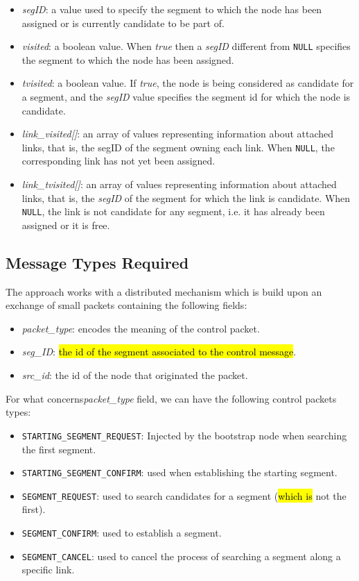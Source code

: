 \begin{itemize}
\item{\emph{segID}}: a value used to specify the segment to which the
node has been assigned or is currently candidate to be part of.
\item{\emph{visited}}: a boolean value. When \emph{true}
then a \emph{segID} different from \texttt{NULL} specifies the segment 
to which the node has been assigned. 
\item{\emph{tvisited}}: a boolean value. If \emph{true}, the node is
being considered as candidate for a segment, and the \emph{segID} value
specifies the segment id for which the node is candidate. 
\item{\emph{link\_visited[]}}: an array
of values representing information about attached links, that is, the
segID of the segment owning each link. When \texttt{NULL}, the corresponding link has not yet been
assigned.
\item{\emph{link\_tvisited[]}}: an array of
values representing information about attached links, that is, the \emph{segID} of
the segment for which the link is candidate. When \texttt{NULL}, the link is
not candidate for any segment, i.e. it has already been assigned or it is free.
\end{itemize}

\subsection{Message Types Required}

The \disr{} approach works with a distributed mechanism which is build
upon an exchange of small packets containing the following fields:
\begin{itemize}
\item \emph{packet\_type}: encodes the meaning of the control packet.
\item \emph{seg\_ID}: \hl{the id of the segment associated to the \disr{} control message}.
\item \emph{src\_id}: the id of the node that originated the packet.
\end{itemize}

For what concerns\emph{packet\_type} field, we can have the following control packets types:
\begin{itemize}
\item{\texttt{STARTING\_SEGMENT\_REQUEST}}: Injected by the bootstrap
node when searching the first segment. 
\item{\texttt{STARTING\_SEGMENT\_CONFIRM}}: used when establishing
the starting segment. 
\item{\texttt{SEGMENT\_REQUEST}}: used to search candidates for a segment (\hl{which is} not the
first).
\item{\texttt{SEGMENT\_CONFIRM}}: used to establish a segment. 
\item{\texttt{SEGMENT\_CANCEL}}: used to cancel the process of searching a segment along a
specific link.
\end{itemize}

